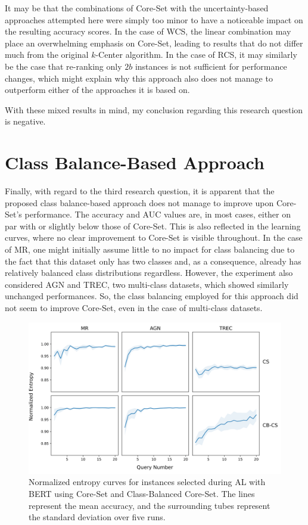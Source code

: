 \documentclass[english,bachelor,ul]{webisthesis} %
\begin{document}
It may be that the combinations of Core-Set with the uncertainty-based approaches attempted here were simply too minor to have a noticeable impact on the resulting accuracy scores. In the case of WCS, the linear combination may place an overwhelming emphasis on Core-Set, leading to results that do not differ much from the original $k$-Center algorithm. In the case of RCS, it may similarly be the case that re-ranking only $2b$ instances is not sufficient for performance changes, which might explain why this approach also does not manage to outperform either of the approaches it is based on.

With these mixed results in mind, my conclusion regarding this research question is negative.

\section{Class Balance-Based Approach}

Finally, with regard to the third research question, it is apparent that the proposed class balance-based approach does not manage to improve upon Core-Set's performance. The accuracy and AUC values are, in most cases, either on par with or slightly below those of Core-Set. This is also reflected in the learning curves, where no clear improvement to Core-Set is visible throughout. In the case of MR, one might initially assume little to no impact for class balancing due to the fact that this dataset only has two classes and, as a consequence, already has relatively balanced class distributions regardless. However, the experiment also considered AGN and TREC, two multi-class datasets, which showed similarly unchanged performances. So, the class balancing employed for this approach did not seem to improve Core-Set, even in the case of multi-class datasets.

\begin{figure}[htbp]
    \centering
    \includegraphics[scale=0.55]{img/entropy_plots_new-1.png}
    \caption{Normalized entropy curves for instances selected during AL with BERT using Core-Set and Class-Balanced Core-Set. The lines represent the mean accuracy, and the surrounding tubes represent the standard deviation over five runs.}
    \label{fig:entropy-plot}
\end{figure}
\end{document}
